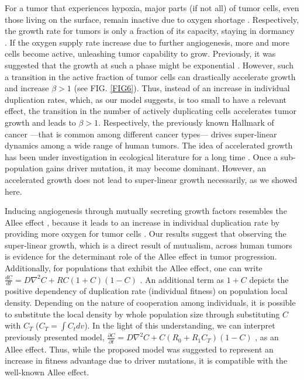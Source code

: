 \documentclass[aps,prl, superscriptaddress,groupedaddress]{revtex4}  %
\begin{document}
	For a tumor that experiences hypoxia, major parts (if not all) of tumor cells, even those living on the surface, remain inactive due to oxygen shortage \cite{rodriguez2013tumor}. Respectively, the growth rate for tumors is only a fraction of its capacity, staying in dormancy \cite{hahnfeldt1999tumor, naumov2008tumor}. If the oxygen supply rate increase due to further angiogenesis, more and more cells become active, unleashing tumor capability to grow. Previously, it was suggested that the growth at such a phase might be exponential \cite{naumov2008tumor}. However, such a transition in the active fraction of tumor cells can drastically accelerate growth and increase $\beta>1$ (see FIG. \ref{FIG6}).  Thus, instead of an increase in individual duplication rates, which, as our model suggests, is too small to have a relevant effect, the transition in the number of actively duplicating cells accelerates tumor growth and leads to $\beta>1$. Respectively, the previously known Hallmark of cancer ---that is common among different cancer types--- drives super-linear dynamics among a wide range of human tumors.  The idea of accelerated growth has been under investigation in ecological literature for a long time \cite{phillips2010evolutionarily,benichou2012front, hallatschek2014acceleration}. Once a sub-population gains driver mutation, it may become dominant. However,  an accelerated growth does not lead to super-linear growth necessarily, as we showed here.     
	
	Inducing angiogenesis through mutually secreting growth factors resembles the Allee effect \cite{gatenby2019first, gatenby2020eradicating}, because it leads to an increase in individual duplication rate by providing more oxygen for tumor cells \cite{korolev2014turning}. Our results suggest that observing the super-linear growth, which is a direct result of mutualism, across human tumors is evidence for the determinant role of the Allee effect in tumor progression.  Additionally, for populations that exhibit the Allee effect, one can write $\frac{dC}{dt}=D\nabla^2C+ RC(1+C)(1-C)$ \cite{fadai2020unpacking}. An additional term as $1+C$ depicts the positive dependency of duplication rate (individual fitness) on population local density. Depending on the nature of cooperation among individuals, it is possible to substitute the local density by whole population size through substituting $C$ with $C_T$  ($C_T=\int C_t dv$). In the light of this understanding, we can interpret previously presented model, $\frac{\partial C}{\partial t}=D\nabla^2C+C(R_0+R_1 C_T) (1-C)$ \cite{Victor2020superlinear},  as an Allee effect. Thus, while the proposed model was suggested to represent an increase in fitness advantage due to driver mutations, it is compatible with the well-known Allee effect.  
	
\end{document}
